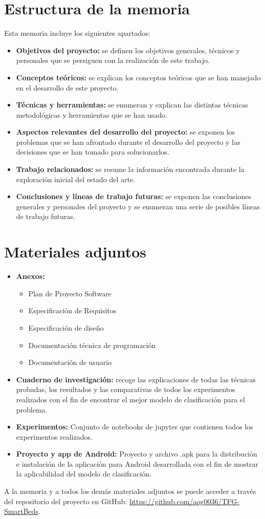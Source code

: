 \section{Estructura de la memoria}

Esta memoria incluye los siguientes apartados: 

\begin{itemize}
	\item \textbf{Objetivos del proyecto:} se definen los objetivos generales, técnicos y personales que se persiguen con la realización de este trabajo. 
	\item \textbf{Conceptos teóricos:} se explican los conceptos teóricos que se han manejado en el desarrollo de este proyecto. 
	\item \textbf{Técnicas y herramientas:} se enumeran y explican las distintas técnicas metodológicas y herramientas que se han usado. 
	\item \textbf{Aspectos relevantes del desarrollo del proyecto:} se exponen los problemas que se han afrontado durante el desarrollo del proyecto y las decisiones que se han tomado para solucionarlos. 
	\item \textbf{Trabajo relacionados:} se resume la información encontrada durante la exploración inicial del estado del arte. 
	\item \textbf{Conclusiones y líneas de trabajo futuras:} se exponen las conclusiones generales y personales del proyecto y se enumeran una serie de posibles líneas de trabajo futuras. 
\end{itemize}

\section{Materiales adjuntos}

\begin{itemize}	
	\item \textbf{Anexos:}
	\begin{itemize}
		\item Plan de Proyecto Software 
		\item Especificación de Requisitos
		\item Especificación de diseño
		\item Documentación técnica de programación 
		\item Documentación de usuario 
	\end{itemize}
	\item \textbf{Cuaderno de investigación:} recoge las explicaciones de todas las técnicas probadas, los resultados y las comparativas de todos los experimentos realizados con el fin de encontrar el mejor modelo de clasificación para el problema. 
	\item \textbf{Experimentos:} Conjunto de notebooks de jupyter que contienen todos los experimentos realizados. 
	\item \textbf{Proyecto y app de Android:} Proyecto y archivo .apk para la distribución e instalación de la aplicación para Android desarrollada con el fin de mostrar la aplicabilidad del modelo de clasificación. 
\end{itemize}

A la memoria y a todos los demás materiales adjuntos se puede acceder a través del repositorio del proyecto en GitHub: \url{https://github.com/aog0036/TFG-SmartBeds}. 


